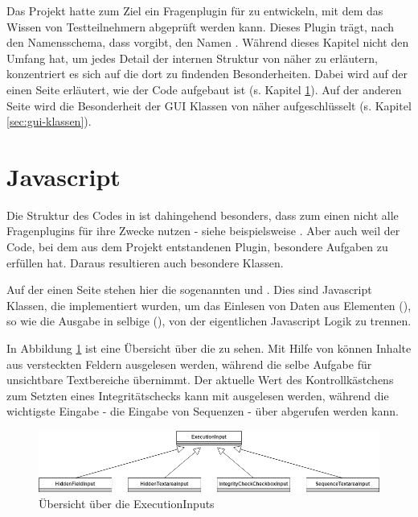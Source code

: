 Das  Projekt hatte zum Ziel ein Fragenplugin für  zu entwickeln, mit dem das  Wissen von Testteilnehmern abgeprüft werden kann. Dieses Plugin trägt, nach den Namensschema, dass  vorgibt, den Namen . 
Während dieses Kapitel nicht den Umfang hat, um jedes Detail der internen Struktur von  näher zu erläutern, konzentriert es sich auf die dort zu findenden Besonderheiten. Dabei wird auf der einen Seite erläutert, wie der  Code aufgebaut ist (s. Kapitel \ref{sec:javascript}). Auf der anderen Seite wird die Besonderheit der GUI Klassen von  näher aufgeschlüsselt (s. Kapitel \ref{sec:gui-klassen}).

\section{Javascript}
\label{sec:javascript}

Die Struktur des  Codes in  ist dahingehend besonders, dass zum einen nicht alle  Fragenplugins  für ihre Zwecke nutzen - siehe beispielsweise . Aber auch weil der  Code, bei dem aus dem  Projekt entstandenen Plugin, besondere Aufgaben zu erfüllen hat. Daraus resultieren auch besondere Klassen.

Auf der einen Seite stehen hier die sogenannten  und . Dies sind Javascript Klassen, die implementiert wurden, um das Einlesen von Daten aus  Elementen (), so wie die Ausgabe in selbige (), von der eigentlichen Javascript Logik zu trennen.

In Abbildung \ref{fig:execution-inputs} ist eine Übersicht über die  zu sehen. Mit Hilfe von  können Inhalte aus versteckten Feldern ausgelesen werden, während  die selbe Aufgabe für unsichtbare Textbereiche übernimmt. Der aktuelle Wert des Kontrollkästchens zum Setzten eines Integritätschecks kann mit  ausgelesen werden, während die wichtigste Eingabe - die Eingabe von  Sequenzen - über  abgerufen werden kann.

    \begin{figure}[H]
        \begin{center}
            \includegraphics[page=1, width=0.7\paperwidth, trim=0 0 0 0, clip]{fig/ExecutionInputs.png} 
            \caption{Übersicht über die ExecutionInputs}
            \label{fig:execution-inputs}
        \end{center}
    \end{figure}
    
